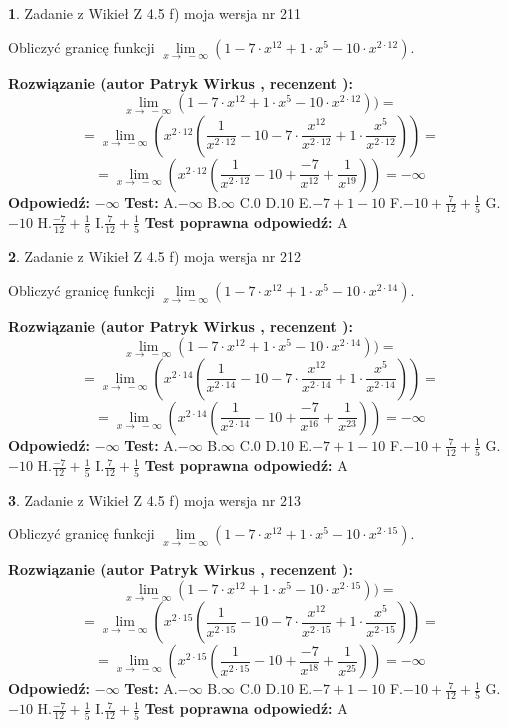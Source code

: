 \documentclass[12pt, a4paper]{article}
\theoremstyle{definition} %
\newtheorem{zad}{}
\newcommand{\zadStart}[1]{\begin{zad}#1\newline}
\newcommand{\zadStop}{\end{zad}}
\newcommand{\rozwStart}[2]{\noindent \textbf{Rozwiązanie (autor #1 , recenzent #2): }\newline}
\newcommand{\rozwStop}{\newline}
\newcommand{\odpStart}{\noindent \textbf{Odpowiedź:}\newline}
\newcommand{\odpStop}{\newline}
\newcommand{\testStart}{\noindent \textbf{Test:}\newline}
\newcommand{\testStop}{\newline}
\newcommand{\kluczStart}{\noindent \textbf{Test poprawna odpowiedź:}\newline}
\newcommand{\kluczStop}{\newline}
\begin{document}
\zadStart{Zadanie z Wikieł Z 4.5 f) moja wersja nr 211}



Obliczyć granicę funkcji  $\lim\limits_{x\to\ -\infty}(1 - 7 \cdot x^{12}+1 \cdot x^{5}- 10 \cdot x^{2\cdot12})$.
\zadStop
\rozwStart{Patryk Wirkus}{}
$$\lim\limits_{x\to\ -\infty}(1 - 7 \cdot x^{12}+1 \cdot x^{5}- 10 \cdot x^{2\cdot12}))=$$
$$=\lim\limits_{x\to\ -\infty}(x^{2\cdot12}(\frac{1}{x^{2\cdot12}}-10 -7 \cdot \frac{x^{12}}{x^{2\cdot12}}+1 \cdot \frac{x^{5}}{x^{2\cdot12}}))=$$
$$=\lim\limits_{x\to\ -\infty}(x^{2\cdot12}(\frac{1}{x^{2\cdot12}}-10 + \frac{-7}{x^{12}}+ \frac{1}{x^{19}}))=-\infty$$
\rozwStop
\odpStart
$-\infty$
\odpStop
\testStart
A.$-\infty$ B.$\infty$ C.$0$ D.$10$ E.$-7 + 1 - 10$
F.$-10+\frac{7}{12}+\frac{1}{5}$ G.$-10$
H.$\frac{-7}{12}+\frac{1}{5}$
I.$\frac{7}{12}+\frac{1}{5}$
\testStop
\kluczStart
A
\kluczStop



\zadStart{Zadanie z Wikieł Z 4.5 f) moja wersja nr 212}



Obliczyć granicę funkcji  $\lim\limits_{x\to\ -\infty}(1 - 7 \cdot x^{12}+1 \cdot x^{5}- 10 \cdot x^{2\cdot14})$.
\zadStop
\rozwStart{Patryk Wirkus}{}
$$\lim\limits_{x\to\ -\infty}(1 - 7 \cdot x^{12}+1 \cdot x^{5}- 10 \cdot x^{2\cdot14}))=$$
$$=\lim\limits_{x\to\ -\infty}(x^{2\cdot14}(\frac{1}{x^{2\cdot14}}-10 -7 \cdot \frac{x^{12}}{x^{2\cdot14}}+1 \cdot \frac{x^{5}}{x^{2\cdot14}}))=$$
$$=\lim\limits_{x\to\ -\infty}(x^{2\cdot14}(\frac{1}{x^{2\cdot14}}-10 + \frac{-7}{x^{16}}+ \frac{1}{x^{23}}))=-\infty$$
\rozwStop
\odpStart
$-\infty$
\odpStop
\testStart
A.$-\infty$ B.$\infty$ C.$0$ D.$10$ E.$-7 + 1 - 10$
F.$-10+\frac{7}{12}+\frac{1}{5}$ G.$-10$
H.$\frac{-7}{12}+\frac{1}{5}$
I.$\frac{7}{12}+\frac{1}{5}$
\testStop
\kluczStart
A
\kluczStop



\zadStart{Zadanie z Wikieł Z 4.5 f) moja wersja nr 213}



Obliczyć granicę funkcji  $\lim\limits_{x\to\ -\infty}(1 - 7 \cdot x^{12}+1 \cdot x^{5}- 10 \cdot x^{2\cdot15})$.
\zadStop
\rozwStart{Patryk Wirkus}{}
$$\lim\limits_{x\to\ -\infty}(1 - 7 \cdot x^{12}+1 \cdot x^{5}- 10 \cdot x^{2\cdot15}))=$$
$$=\lim\limits_{x\to\ -\infty}(x^{2\cdot15}(\frac{1}{x^{2\cdot15}}-10 -7 \cdot \frac{x^{12}}{x^{2\cdot15}}+1 \cdot \frac{x^{5}}{x^{2\cdot15}}))=$$
$$=\lim\limits_{x\to\ -\infty}(x^{2\cdot15}(\frac{1}{x^{2\cdot15}}-10 + \frac{-7}{x^{18}}+ \frac{1}{x^{25}}))=-\infty$$
\rozwStop
\odpStart
$-\infty$
\odpStop
\testStart
A.$-\infty$ B.$\infty$ C.$0$ D.$10$ E.$-7 + 1 - 10$
F.$-10+\frac{7}{12}+\frac{1}{5}$ G.$-10$
H.$\frac{-7}{12}+\frac{1}{5}$
I.$\frac{7}{12}+\frac{1}{5}$
\testStop
\kluczStart
A
\kluczStop
\end{document}
